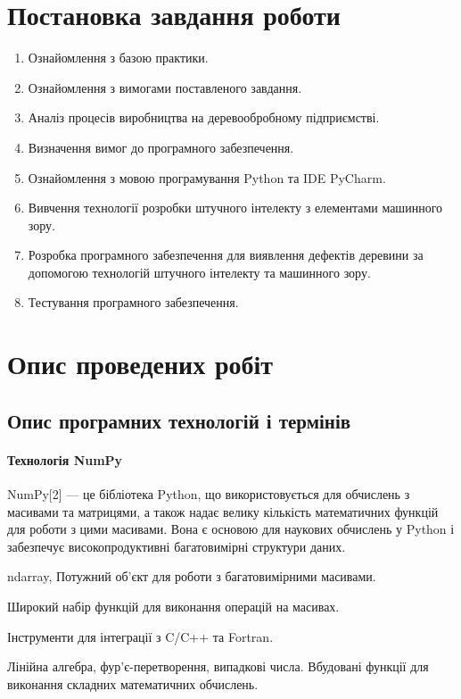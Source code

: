 \documentclass[oneside,14pt]{extarticle}
\begin{document}
\section{Постановка завдання роботи}
\begin{enumerate}
	\item Ознайомлення з базою практики.
	\item Ознайомлення з вимогами поставленого завдання.
	\item Аналіз процесів виробництва на деревообробному підприємстві.
	\item Визначення вимог до програмного забезпечення.
	\item Ознайомлення з мовою програмування Python та IDE PyCharm.
	\item Вивчення технології розробки штучного інтелекту з елементами машинного зору.
	\item Розробка програмного забезпечення для виявлення дефектів деревини за допомогою технологій штучного інтелекту та машинного зору.
	\item Тестування програмного забезпечення.
\end{enumerate}

\section{Опис проведених робіт}

\subsection{Опис програмних технологій і термінів}

\paragraph{Технологія NumPy}

NumPy[2] — це бібліотека Python, що використовується для обчислень з масивами та матрицями, а також надає велику кількість математичних функцій для роботи з цими масивами. Вона є основою для наукових обчислень у Python і забезпечує високопродуктивні багатовимірні структури даних.

\begin{list}{-}{Основні можливості NumPy:}
	\item ndarray, Потужний об'єкт для роботи з багатовимірними масивами.
	\item Широкий набір функцій для виконання операцій на масивах.
	\item Інструменти для інтеграції з C/C++ та Fortran.
	\item Лінійна алгебра, фур'є-перетворення, випадкові числа. Вбудовані функції для виконання складних математичних обчислень.
\end{list}
\end{document}
